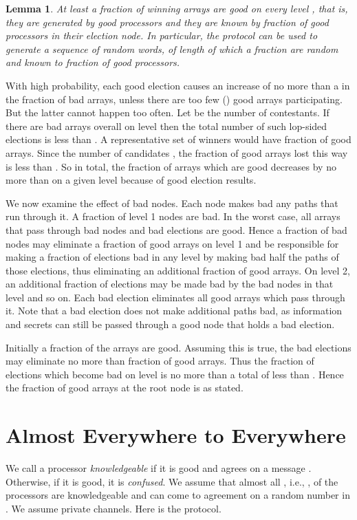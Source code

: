 \documentclass[letterpaper,11pt]{article}
\newtheorem{lemma}{Lemma}
\newcommand{\sq}{\hbox{\rlap{}}}
\newcommand{\qed}{\hspace*{\fill}\sq}
\newenvironment{proof}{\noindent {\bf Proof:}}{\qed\par\vskip 4mm\par}
\begin{document}
\begin{lemma}
At least a  fraction of  winning arrays are good on every level , that is, they are generated by good processors and
they are known by  fraction of good processors in their election node. 
In particular, the protocol can be used to generate a sequence of random words, of length  of which a  fraction are random and known to  fraction of good processors. 
\end{lemma}


\begin{proof}
With high probability, each good election causes an increase of  no more than a  in the fraction of bad arrays, unless
there are too few () good arrays participating.   But the latter cannot happen too often.  Let  be the number of contestants.
 If there are  bad arrays overall on level  then the total number of such lop-sided elections  is less than . A representative set
 of winners would have  fraction of good arrays. Since the number of candidates , the fraction of good arrays lost this way is less  than .
   So in total, the fraction of arrays which are good decreases by no more than  on a given level because of good election results.

 We now examine the effect of bad nodes. Each node makes bad any paths that run through it.  A fraction of  level 1 nodes are bad. In the worst case, all arrays that pass through bad nodes and bad elections are good. Hence  a  fraction of  bad nodes may eliminate a
 fraction of good arrays on level 1 and be responsible for making a  fraction of elections bad in any level  by making bad half the paths of those elections, thus eliminating an additional fraction of  good arrays.  On level 2, an additional  fraction of elections may be made bad by the bad nodes in that level and so on.  Each bad election eliminates all good arrays which pass through it. Note that a bad election does not make additional paths bad, as information and secrets can still be passed through a good node that holds a bad election. 

 Initially a  fraction of the arrays are good. Assuming this is true,  the bad elections  may eliminate no more than  fraction of good arrays.  Thus the fraction of elections which become bad on level   is no more than a total of less than .  Hence the fraction of good arrays at the root node is as stated. 
\end{proof}  

\section{Almost Everywhere to Everywhere}\label{s:AE2E}
We call a processor {\it knowledgeable} if it is good and agrees on a message .   Otherwise, if it is good, it is {\it confused}.  We assume that almost all , i.e., ,  of the processors are  knowledgeable and can come to agreement on a random number   in . We assume private channels.  Here is the protocol.
\end{document}
